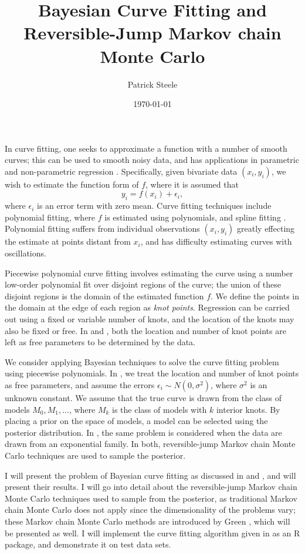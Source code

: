 \documentclass{article}
\title{Bayesian Curve Fitting and Reversible-Jump Markov chain Monte
  Carlo}
\author{Patrick Steele}
\date{\today}
\begin{document}
\maketitle

\noindent In curve fitting, one seeks to approximate a function with a
number of smooth curves; this can be used to smooth noisy data, and
has applications in parametric and non-parametric regression
\cite{denison1998automatic}. Specifically, given bivariate data $(x_i,
y_i)$, we wish to estimate the function form of $f$, where it is
assumed that
\begin{equation*}
  y_i = f(x_i) + \epsilon_i,
\end{equation*}
where $\epsilon_i$ is an error term with zero mean. Curve fitting
techniques include polynomial fitting, where $f$ is estimated using
polynomials, and spline fitting
\cite{hastie1990generalized}. Polynomial fitting suffers from
individual observations $(x_i, y_i)$ greatly effecting the estimate at
points distant from $x_i$, and has difficulty estimating curves with
oscillations.

Piecewise polynomial curve fitting involves estimating the curve using
a number low-order polynomial fit over disjoint regions of the curve;
the union of these disjoint regions is the domain of the estimated
function $f$. We define the points in the domain at the edge of each
region as \textit{knot points}. Regression can be carried out using a
fixed or variable number of knots, and the location of the knots may
also be fixed or free. In \cite{denison1998automatic} and
\cite{dimatteo2001bayesian}, both the location and number of knot
points are left as free parameters to be determined by the data.

We consider applying Bayesian techniques to solve the curve fitting
problem using piecewise polynomials. In \cite{denison1998automatic},
we treat the location and number of knot points as free parameters,
and assume the errors $\epsilon_i \sim N(0, \sigma^2)$, where
$\sigma^2$ is an unknown constant. We assume that the true curve is
drawn from the class of models $M_0, M_1, \ldots$, where $M_k$ is the
class of models with $k$ interior knots. By placing a prior on the
space of models, a model can be selected using the posterior
distribution. In \cite{dimatteo2001bayesian}, the same problem is
considered when the data are drawn from an exponential family. In
both, reversible-jump Markov chain Monte Carlo techniques are used to
sample the posterior.

I will present the problem of Bayesian curve fitting as discussed in
\cite{denison1998automatic} and \cite{dimatteo2001bayesian}, and will
present their results. I will go into detail about the reversible-jump
Markov chain Monte Carlo techniques used to sample from the posterior,
as traditional Markov chain Monte Carlo does not apply since the
dimensionality of the problems vary; these Markov chain Monte Carlo
methods are introduced by Green \cite{green1995reversible}, which will
be presented as well. I will implement the curve fitting algorithm
given in \cite{denison1998automatic} as an R package, and demonstrate
it on test data sets.



\end{document}
